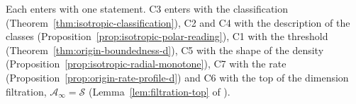 Each enters with one statement. C3 enters with the classification
(Theorem~\ref{thm:isotropic-classification}), C2 and C4 with the description of the classes
(Proposition~\ref{prop:isotropic-polar-reading}), C1 with the threshold
(Theorem~\ref{thm:origin-boundedness-d}), C5 with the shape of the density
(Proposition~\ref{prop:isotropic-radial-monotone}), C7 with the rate
(Proposition~\ref{prop:origin-rate-profile-d}) and C6 with the top of the dimension
filtration, $\mathcal{A}_\infty = \mathcal{S}$ (Lemma~\ref{lem:filtration-top} of \suppl).


